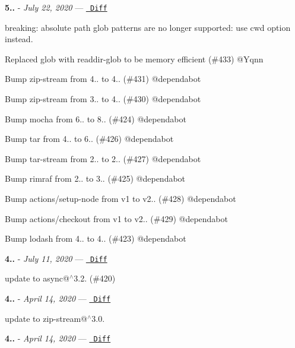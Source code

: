 {\bfseries{5..}} -\/ 
\footnotesize {\itshape July 22, 2020}
\normalsize  — \href{https://github.com/archiverjs/node-archiver/compare/4.0.2...5.0.0}{\texttt{ Diff}}


\begin{DoxyItemize}
\item breaking\+: absolute path glob patterns are no longer supported\+: use cwd option instead.
\item Replaced glob with readdir-\/glob to be memory efficient (\#433) @\+Yqnn
\item Bump zip-\/stream from 4.. to 4.. (\#431) @dependabot
\item Bump zip-\/stream from 3.. to 4.. (\#430) @dependabot
\item Bump mocha from 6.. to 8.. (\#424) @dependabot
\item Bump tar from 4.. to 6.. (\#426) @dependabot
\item Bump tar-\/stream from 2.. to 2.. (\#427) @dependabot
\item Bump rimraf from 2.. to 3.. (\#425) @dependabot
\item Bump actions/setup-\/node from v1 to v2.. (\#428) @dependabot
\item Bump actions/checkout from v1 to v2.. (\#429) @dependabot
\item Bump lodash from 4.. to 4.. (\#423) @dependabot
\end{DoxyItemize}

{\bfseries{4..}} -\/ 
\footnotesize {\itshape July 11, 2020}
\normalsize  — \href{https://github.com/archiverjs/node-archiver/compare/4.0.1...4.0.2}{\texttt{ Diff}}


\begin{DoxyItemize}
\item update to async@\texorpdfstring{$^\wedge$}{\string^}3.2. (\#420)
\end{DoxyItemize}

{\bfseries{4..}} -\/ 
\footnotesize {\itshape April 14, 2020}
\normalsize  — \href{https://github.com/archiverjs/node-archiver/compare/4.0.0...4.0.1}{\texttt{ Diff}}


\begin{DoxyItemize}
\item update to zip-\/stream@\texorpdfstring{$^\wedge$}{\string^}3.0.
\end{DoxyItemize}

{\bfseries{4..}} -\/ 
\footnotesize {\itshape April 14, 2020}
\normalsize  — \href{https://github.com/archiverjs/node-archiver/compare/3.1.1...4.0.0}{\texttt{ Diff}}


